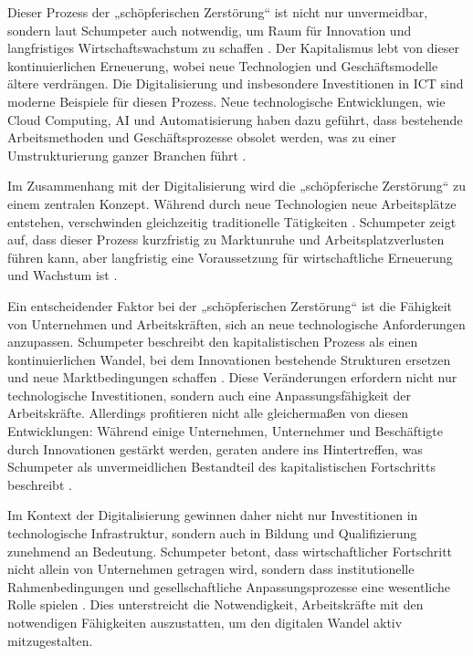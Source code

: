 Dieser Prozess der „schöpferischen Zerstörung“ ist nicht nur unvermeidbar, sondern laut 
Schumpeter auch notwendig, um Raum für Innovation und langfristiges Wirtschaftswachstum zu 
schaffen \parencite[vgl.][S. 83]{schumpeter1976capitalism}. Der Kapitalismus lebt von dieser 
kontinuierlichen Erneuerung, wobei neue Technologien und Geschäftsmodelle ältere verdrängen. Die 
Digitalisierung und insbesondere Investitionen in \ac{ICT} sind moderne Beispiele für diesen 
Prozess. Neue technologische Entwicklungen, wie Cloud Computing, \ac{AI} und Automatisierung 
haben dazu geführt, dass bestehende Arbeitsmethoden und Geschäftsprozesse obsolet werden, was zu 
einer Umstrukturierung ganzer Branchen führt \parencite[vgl.][S. 44]{frey2013thefuture}. 

Im Zusammenhang mit der Digitalisierung wird die „schöpferische Zerstörung“ zu einem zentralen 
Konzept. Während durch neue Technologien neue Arbeitsplätze entstehen, verschwinden gleichzeitig 
traditionelle Tätigkeiten \parencite[vgl.][S. 8–9]{balsmeier2019isthis}. Schumpeter zeigt auf, 
dass dieser Prozess kurzfristig zu Marktunruhe und Arbeitsplatzverlusten führen kann, aber 
langfristig eine Voraussetzung für wirtschaftliche Erneuerung und Wachstum ist 
\parencite[vgl.][S. 82–83]{schumpeter1976capitalism}. 

Ein entscheidender Faktor bei der „schöpferischen Zerstörung“ ist die Fähigkeit von Unternehmen 
und Arbeitskräften, sich an neue technologische Anforderungen anzupassen. Schumpeter beschreibt 
den kapitalistischen Prozess als einen kontinuierlichen Wandel, bei dem Innovationen bestehende 
Strukturen ersetzen und neue Marktbedingungen schaffen 
\parencite[vgl.][S. 83–84]{schumpeter1976capitalism}. Diese Veränderungen erfordern nicht nur 
technologische Investitionen, sondern auch eine Anpassungsfähigkeit der Arbeitskräfte. Allerdings 
profitieren nicht alle gleichermaßen von diesen Entwicklungen: Während einige Unternehmen, 
Unternehmer und Beschäftigte durch Innovationen gestärkt werden, geraten andere ins 
Hintertreffen, was Schumpeter als unvermeidlichen Bestandteil des kapitalistischen Fortschritts 
beschreibt \parencite[vgl.][S. 84–86]{schumpeter1976capitalism}. 

Im Kontext der Digitalisierung gewinnen daher nicht nur Investitionen in technologische 
Infrastruktur, sondern auch in Bildung und Qualifizierung zunehmend an Bedeutung. Schumpeter 
betont, dass wirtschaftlicher Fortschritt nicht allein von Unternehmen getragen wird, sondern 
dass institutionelle Rahmenbedingungen und gesellschaftliche Anpassungsprozesse eine wesentliche 
Rolle spielen \parencite[vgl.][S. 132–133]{schumpeter1976capitalism}. Dies unterstreicht die 
Notwendigkeit, Arbeitskräfte mit den notwendigen Fähigkeiten auszustatten, um den digitalen 
Wandel aktiv mitzugestalten.  

